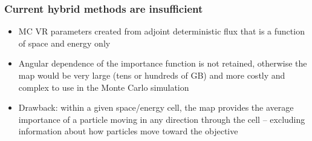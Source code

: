 \documentclass[xcolor=x11names,compress]{beamer}
\renewcommand{\(}{\begin{columns}}
\renewcommand{\)}{\end{columns}}
\newcommand{\<}[1]{\begin{column}{#1}}
\renewcommand{\>}{\end{column}}
\begin{document}
\begin{frame}[fragile]
  \frametitle{Current hybrid methods are insufficient}

	\begin{itemize}
	\item MC VR parameters created from adjoint deterministic flux that is a function of space and energy only
	\item Angular dependence of the importance function is not retained, otherwise the map would be very large (tens or hundreds of GB) and more costly and complex to use in the Monte Carlo simulation
	\item Drawback: within a given space/energy cell, the map provides the average importance of a particle moving in any direction through the cell -- excluding information about how particles move toward the objective
	\end{itemize}

\end{frame}
\end{document}
